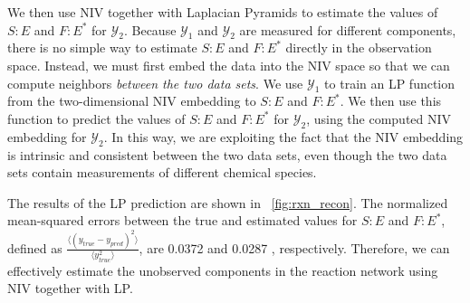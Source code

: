 We then use NIV together with Laplacian Pyramids to estimate the values of $S:E$ and $F:E^{*}$ for $\mathcal{Y}_2$.
%
Because $\mathcal{Y}_1$ and $\mathcal{Y}_2$ are measured for different components, there is no simple way to estimate $S:E$ and $F:E^{*}$ directly in the observation space.
%
Instead, we must first embed the data into the NIV space so that we can compute neighbors {\em between the two data sets}.
%
We use $\mathcal{Y}_1$ to train an LP function from the two-dimensional NIV embedding to $S:E$ and $F:E^{*}$.
%
We then use this function to predict the values  of $S:E$ and $F:E^{*}$ for $\mathcal{Y}_2$, using the computed NIV embedding for $\mathcal{Y}_2$.
%
In this way, we are exploiting the fact that the NIV embedding is intrinsic and consistent between the two data sets, even though the two data sets contain measurements of different chemical species.

The results of the LP prediction are shown in \fig~\ref{fig:rxn_recon}.
%
The normalized mean-squared errors between the true and estimated values for $S:E$ and $F:E^{*}$, defined as $\frac{\langle (y_{true}-y_{pred})^2 \rangle}{\langle y_{true}^2 \rangle}$, are 0.0372 and 0.0287 , respectively.
%
Therefore, we can effectively estimate the unobserved components in the reaction network using NIV together with LP.
%


